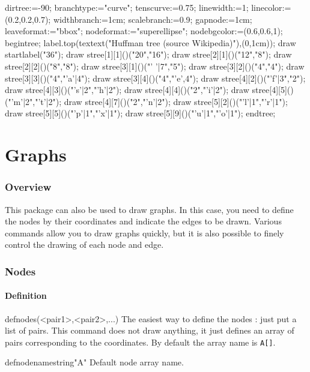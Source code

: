 \documentclass[11pt,a4paper,english]{article}
\begin{document}
\begin{exemple}
dirtree:=-90;
branchtype:="curve";  tenscurve:=0.75;
linewidth:=1;         linecolor:=(0.2,0.2,0.7);
widthbranch:=1cm;     scalebranch:=0.9;
gapnode:=1cm;
leaveformat:="bbox";
nodeformat:="superellipse"; nodebgcolor:=(0.6,0.6,1);
begintree;
label.top(textext("\Large Huffman tree (source Wikipedia)"),(0,1cm));
draw startlabel("36");
draw stree[1][1]()("20","16");
draw stree[2][1]()("12","8");
draw stree[2][2]()("8","8");
draw stree[3][1]()("' '|7","5");
draw stree[3][2]()("4","4");
draw stree[3][3]()("4","'a'|4");
draw stree[3][4]()("4","'e',4");
draw stree[4][2]()("'f'|3","2");
draw stree[4][3]()("'s'|2","'h'|2");
draw stree[4][4]()("2","'i'|2");
draw stree[4][5]()("'m'|2","'t'|2");
draw stree[4][7]()("2","'n'|2");
draw stree[5][2]()("'l'|1","'r'|1");
draw stree[5][5]()("'p'|1","'x'|1");
draw stree[5][9]()("'u'|1","'o'|1");
endtree;
\end{exemple}

\part{Graphs}
\section{Overview}
This package can also be used to draw graphs. In this case, you need to define the nodes by their coordinates and indicate the edges to be drawn. Various commands allow you to draw graphs quickly, but it is also possible to finely control the drawing of each node and edge.

\section{Nodes}
\subsection{Definition}

\begin{rpdeclaration}{defnodes(<pair1>,<pair2>,...)}
The easiest way to define the nodes : just put a list of pairs. This command does not draw anything, it just defines an array of pairs corresponding to the coordinates. By default the array name is \verb|A[]|.
\end{rpdeclaration}

\begin{mptparam}{defnodename}{string}{"A"}
Default node array name.
\end{mptparam}
\end{document}
